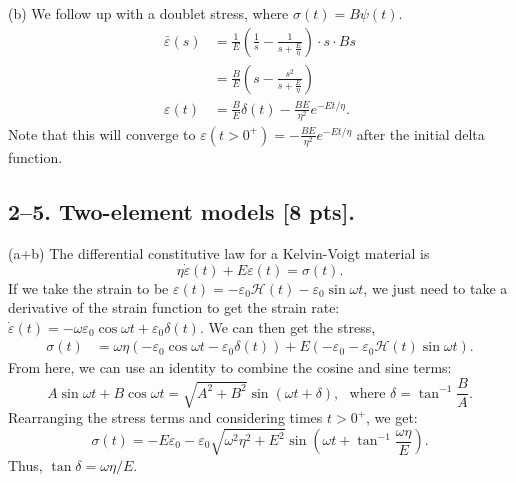 (b) We follow up with a doublet stress, where $\sigma(t) = B\psi(t)$. 
\begin{align*}
    \bar{\varepsilon}(s) &= \frac{1}{E} \left( \frac{1}{s} - \frac{1}{s+\frac{E}{\eta}}\right) \cdot s\cdot Bs\\
    &= \frac{B}{E}\left( s - \frac{s^2}{s+\frac{E}{\eta}} \right)\\
    \varepsilon(t) &= \frac{B}{E}\delta(t) - \frac{BE}{\eta^2} e^{-Et/\eta}.
\end{align*}
Note that this will converge to $\varepsilon(t>0^+)=- \frac{BE}{\eta^2} e^{-Et/\eta}$ after the initial delta function. 


\bigskip
\subsection*{2--5. \textbf{Two-element models} [8 pts].}

(a+b) The differential constitutive law for a Kelvin-Voigt material is
\begin{equation*}
    \eta \dot{\varepsilon}(t) + E \varepsilon(t) = \sigma(t). 
\end{equation*}
If we take the strain to be $\varepsilon(t) = -\varepsilon_0 \mathcal{H}(t) - \varepsilon_0 \sin\omega t$, we just need to take a derivative of the strain function to get the strain rate: $\dot{\varepsilon}(t) = -\omega \varepsilon_0 \cos\omega t + \varepsilon_0\delta(t)$.
We can then get the stress,
\begin{align*}
    \sigma(t) &= \omega \eta (-\varepsilon_0\cos\omega t - \varepsilon_0 \delta(t)) + E(-\varepsilon_0 - \varepsilon_0 \mathcal{H}(t) \sin\omega t).
\end{align*}
From here, we can use an identity to combine the cosine and sine terms:
\begin{equation*}
     A \sin \omega t + B \cos \omega t= \sqrt{A^2 + B^2} \sin (\omega t + \delta), \textrm{~~where } \delta=\tan^{-1}\frac{B}{A}.
\end{equation*}
Rearranging the stress terms and considering times $t>0^+$, we get:
\begin{equation*}
    \sigma(t) = -E\varepsilon_0 - \varepsilon_0 \sqrt{\omega^2 \eta^2 + E^2} \sin\left( \omega t + \tan^{-1} \frac{\omega \eta}{E}\right).
\end{equation*}
Thus, $\tan \delta = \omega\eta/E$.


